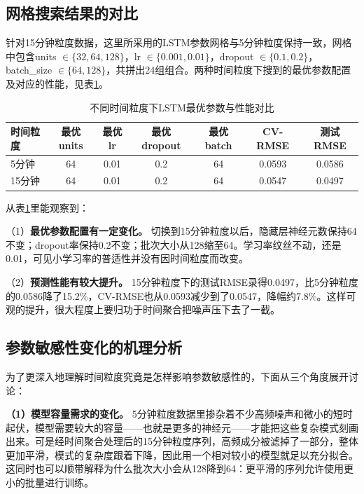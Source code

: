 \documentclass[12pt,a4paper,oneside]{ctexbook}
\begin{document}
	\subsection{网格搜索结果的对比}
	
	针对15分钟粒度数据，这里所采用的LSTM参数网格与5分钟粒度保持一致，网格中包含units $\in \{32, 64, 128\}$，lr $\in \{0.001, 0.01\}$，dropout $\in \{0.1, 0.2\}$，batch\_size $\in \{64, 128\}$，共拼出24组组合。两种时间粒度下搜到的最优参数配置及对应的性能，见表\ref{tab:granularity}。
	
	\begin{table}[H]
		\centering
		\caption{不同时间粒度下LSTM最优参数与性能对比}
		\label{tab:granularity}
		\begin{tabular}{lcccccc}
			\toprule
			时间粒度 & 最优units & 最优lr & 最优dropout & 最优batch & CV-RMSE & 测试RMSE \\
			\midrule
			5分钟  & 64  & 0.01 & 0.2 & 64 & 0.0593 & 0.0586 \\
			15分钟 & 64  & 0.01 & 0.2 & 64  & 0.0547 & 0.0497 \\
			\bottomrule
		\end{tabular}
	\end{table}
	
	从表\ref{tab:granularity}里能观察到：
	
	（1）\textbf{最优参数配置有一定变化。} 切换到15分钟粒度以后，隐藏层神经元数保持64不变；dropout率保持0.2不变；批次大小从128缩至64。学习率纹丝不动，还是0.01，可见小学习率的普适性并没有因时间粒度而改变。
	
	（2）\textbf{预测性能有较大提升。} 15分钟粒度下的测试RMSE录得0.0497，比5分钟粒度的0.0586降了15.2\%，CV-RMSE也从0.0593减少到了0.0547，降幅约7.8\%。这样可观的提升，很大程度上要归功于时间聚合把噪声压下去了一截。
	
	\subsection{参数敏感性变化的机理分析}
	
	为了更深入地理解时间粒度究竟是怎样影响参数敏感性的，下面从三个角度展开讨论：
	
	\textbf{（1）模型容量需求的变化。} 5分钟粒度数据里掺杂着不少高频噪声和微小的短时起伏，模型需要较大的容量——也就是更多的神经元——才能把这些复杂模式刻画出来。可是经时间聚合处理后的15分钟粒度序列，高频成分被滤掉了一部分，整体更加平滑，模式的复杂度跟着下降，因此用一个相对较小的模型就足以充分拟合。这同时也可以顺带解释为什么批次大小会从128降到64：更平滑的序列允许使用更小的批量进行训练。
	
\end{document}
